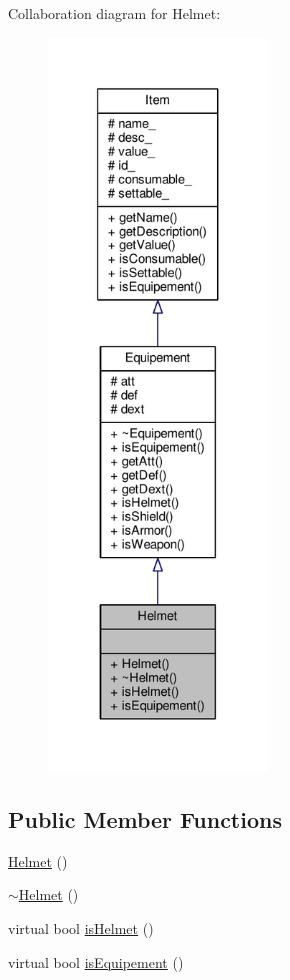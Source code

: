 Collaboration diagram for Helmet\-:\nopagebreak
\begin{figure}[H]
\begin{center}
\leavevmode
\includegraphics[height=550pt]{class_helmet__coll__graph}
\end{center}
\end{figure}
\subsection*{Public Member Functions}
\begin{DoxyCompactItemize}
\item 
\hyperlink{class_helmet_ae9f39c8ca82962c770f9907123e663f5}{Helmet} ()
\item 
\hyperlink{class_helmet_a9a63c1773ef428c93f2414932cbf6d3f}{$\sim$\-Helmet} ()
\item 
virtual bool \hyperlink{class_helmet_ad549da50c87add723974d0171bbcedfa}{is\-Helmet} ()
\item 
virtual bool \hyperlink{class_helmet_aae179ae1a856301583bcca719c2c9acc}{is\-Equipement} ()
\end{DoxyCompactItemize}
